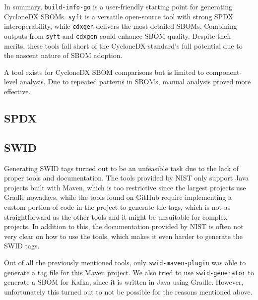 In summary, \verb|build-info-go| is a user-friendly starting point for generating CycloneDX SBOMs. \verb|syft| is a versatile open-source tool with strong SPDX interoperability, while \verb|cdxgen| delivers the most detailed SBOMs. Combining outputs from \verb|syft| and \verb|cdxgen| could enhance SBOM quality. Despite their merits, these tools fall short of the CycloneDX standard's full potential due to the nascent nature of SBOM adoption.

A tool exists for CycloneDX SBOM comparisons but is limited to component-level analysis. Due to repeated patterns in SBOMs, manual analysis proved more effective.

\subsection{SPDX} \label{results:spdx}

\subsection{SWID} \label{results:swid}
Generating SWID tags turned out to be an unfeasible task due to the lack of proper tools and documentation. The tools provided by NIST only support Java projects built with Maven, which is too restrictive since the largest projects use Gradle nowadays, while the tools found on GitHub require implementing a custom portion of code in the project to generate the tags, which is not as straightforward as the other tools and it might be unsuitable for complex projects.
In addition to this, the documentation provided by NIST is often not very clear on how to use the tools, which makes it even harder to generate the SWID tags.

Out of all the previously mentioned tools, only \verb|swid-maven-plugin| was able to generate a tag file for \href{https://github.com/MithunTechnologiesDevOps/maven-web-application}{this} Maven project.
We also tried to use \verb|swid-generator| to generate a SBOM for Kafka, since it is written in Java using Gradle. However, unfortunately this turned out to not be possible for the reasons mentioned above.